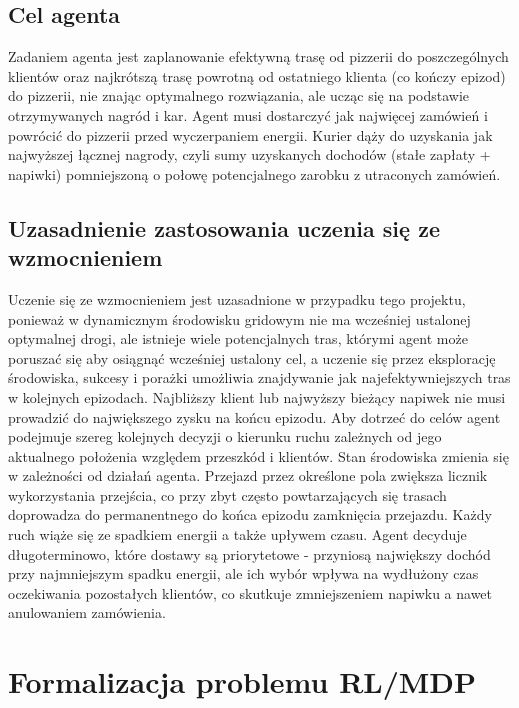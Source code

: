 \documentclass[12pt]{article}
\begin{document}
\subsection{Cel agenta}
Zadaniem agenta jest zaplanowanie efektywną trasę od pizzerii do poszczególnych klientów oraz najkrótszą trasę powrotną od ostatniego klienta (co kończy epizod) do pizzerii, nie znając optymalnego rozwiązania, ale ucząc się na podstawie otrzymywanych nagród i kar. 
Agent musi dostarczyć jak najwięcej zamówień i powrócić do pizzerii przed wyczerpaniem energii.
Kurier dąży do uzyskania jak najwyższej łącznej nagrody, czyli sumy uzyskanych dochodów (stałe zapłaty + napiwki) pomniejszoną o połowę potencjalnego zarobku z utraconych zamówień. 

\subsection{Uzasadnienie zastosowania uczenia się ze wzmocnieniem}
Uczenie się ze wzmocnieniem jest uzasadnione w przypadku tego projektu, ponieważ w dynamicznym środowisku gridowym nie ma wcześniej ustalonej optymalnej drogi, ale istnieje wiele potencjalnych tras, którymi agent może poruszać się aby osiągnąć wcześniej ustalony cel, a uczenie się przez eksplorację środowiska, sukcesy i porażki umożliwia znajdywanie jak najefektywniejszych tras w kolejnych epizodach. Najbliższy klient lub najwyższy bieżący napiwek nie musi prowadzić do największego zysku na końcu epizodu.
Aby dotrzeć do celów agent podejmuje szereg kolejnych decyzji o kierunku ruchu zależnych od jego aktualnego położenia względem przeszkód i klientów.
Stan środowiska zmienia się w zależności od działań agenta. Przejazd przez określone pola zwiększa licznik wykorzystania przejścia, co przy zbyt często powtarzających się trasach doprowadza do permanentnego do końca epizodu zamknięcia przejazdu. Każdy ruch wiąże się ze spadkiem energii a także upływem czasu. Agent decyduje długoterminowo, które dostawy są priorytetowe - przyniosą największy dochód przy najmniejszym spadku energii, ale ich wybór wpływa na wydłużony czas oczekiwania pozostałych klientów, co skutkuje zmniejszeniem napiwku a nawet anulowaniem zamówienia. 


\section{Formalizacja problemu RL/MDP}
\end{document}
